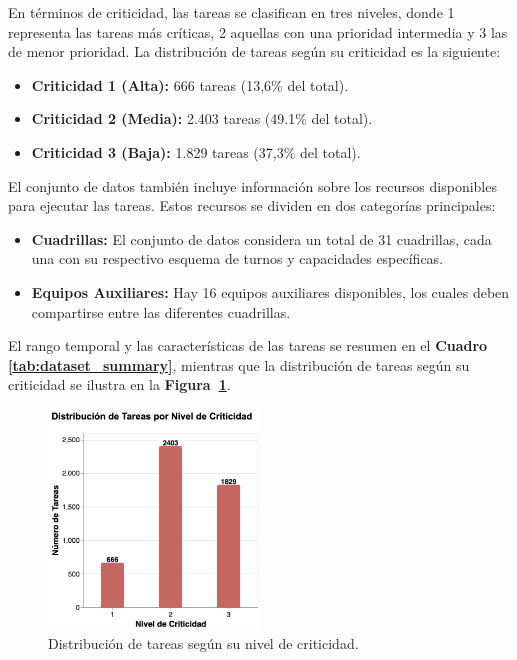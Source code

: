 \documentclass{article}
\begin{document}
En términos de criticidad, las tareas se clasifican en tres niveles, donde 1 representa las tareas más críticas, 2 aquellas con una prioridad intermedia y 3 las de menor prioridad. La distribución de tareas según su criticidad es la siguiente:
\begin{itemize}
    \item \textbf{Criticidad 1 (Alta):} 666 tareas (13,6\% del total).
    \item \textbf{Criticidad 2 (Media):} 2.403 tareas (49.1\% del total).
    \item \textbf{Criticidad 3 (Baja):} 1.829 tareas (37,3\% del total).
\end{itemize}

El conjunto de datos también incluye información sobre los recursos disponibles para ejecutar las tareas. Estos recursos se dividen en dos categorías principales:
\begin{itemize}
    \item \textbf{Cuadrillas:} El conjunto de datos considera un total de 31 cuadrillas, cada una con su respectivo esquema de turnos y capacidades específicas.
    \item \textbf{Equipos Auxiliares:} Hay 16 equipos auxiliares disponibles, los cuales deben compartirse entre las diferentes cuadrillas.
\end{itemize}

El rango temporal y las características de las tareas se resumen en el \textbf{Cuadro \ref{tab:dataset_summary}}, mientras que la distribución de tareas según su criticidad se ilustra en la \textbf{Figura~\ref{fig:barras_impacto}}.


\begin{figure}[htbp]
    \centering
    \includegraphics[width=0.5\textwidth]{imgs/barras_impacto.png}
    \caption{Distribución de tareas según su nivel de criticidad.}
    \label{fig:barras_impacto}
\end{figure}
\end{document}
